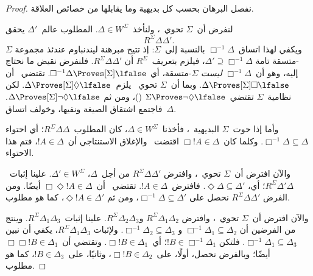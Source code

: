 \documentclass[../../../include/open-logic-section]{subfiles}
\begin{document}
\begin{proof}
  نفصل البرهان بحسب كل بديهية وما يقابلها من خصائص العلاقة.

  لنفرض أن~$\Sigma$ تحوي~، ولنأخذ~$\Delta \in W^\Sigma$.
  المطلوب عالم~$\Delta'$ يحقق
  \[
    R^\Sigma \Delta\Delta'.
  \]
  ويكفي لهذا اتساق~$\Box^{-1}\Delta$ بالنسبة إلى~$\Sigma$:
  إذ تتيح مبرهنة ليندنباوم عندئذ مجموعة $\Sigma$-متسقة تامة
  $\Delta' \supseteq \Box^{-1}\Delta$، فيلزم بتعريف~$R^\Sigma$
  أن
  $R^\Sigma \Delta\Delta'$.
  فلنفرض نقيض ما نحتاج إليه، وهو أن~$\Box^{-1}\Delta$
  \emph{ليست} $\Sigma$-متسقة، أي $\Box^{-1}\Delta \Proves[\Sigma] \lfalse$.
  تقتضي~ أن
  $\Delta \Proves[\Sigma] \Box\lfalse$.
  وبما أن~$\Sigma$ تحوي~ يلزم~$\Delta \Proves[\Sigma] \Diamond\lfalse$.
  لكن نظامية~$\Sigma$ تقتضي~$\Sigma \Proves \lnot\Diamond \lfalse$
  ()، ومن ثم
  $\Delta \Proves[\Sigma] \lnot\Diamond \lfalse$.
  فاجتمع اشتقاق الصيغة ونفيها، وخولف اتساق~$\Delta$.

  وأما إذا حوت~$\Sigma$ البديهية~، فأخذنا~$\Delta \in W^\Sigma$،
  كان المطلوب~$R^\Sigma \Delta\Delta$؛ أي احتواء
  $\Box^{-1}\Delta \subseteq \Delta$.
  وكلما كان~$\Box!A \in \Delta$ اقتضت~ والإغلاق الاستنتاجي
  أن~$!A \in \Delta$، فتم هذا الاحتواء.

  والآن افترض أن~$\Sigma$ تحوي~، وافترض
  $R^\Sigma \Delta\Delta'$ من أجل~$\Delta$، $\Delta' \in W^\Sigma$.
  علينا إثبات~$R^\Sigma \Delta'\Delta$؛ أي،
  $\Diamond\Delta \subseteq \Delta'$. فافترض~$!A \in \Delta$.
  تقتضي~ أن~$\Box\Diamond!A \in \Delta$ أيضًا. ومن الفرض
  $R^\Sigma \Delta\Delta'$ نحصل على
  $\Box^{-1}\Delta \subseteq \Delta'$، ومن ثم
  $\Diamond!A \in \Delta'$، كما هو مطلوب.

  والآن افترض أن~$\Sigma$ تحوي~، وافترض
  $R^\Sigma \Delta_1\Delta_2$ و$R^\Sigma \Delta_2\Delta_3$.
  علينا إثبات~$R^\Sigma \Delta_1\Delta_3$. وينتج من الفرضين
   أن
  $\Box^{-1}\Delta_1 \subseteq \Delta_2$ و
  $\Box^{-1}\Delta_2 \subseteq \Delta_3$. ولإثبات
  $R^\Sigma \Delta_1\Delta_3$، يكفي أن نبين
  $\Box^{-1}\Delta_1 \subseteq \Delta_3$. فلتكن
  $!B \in \Box^{-1}\Delta_1$؛ أي~$\Box!B \in \Delta_1$. وتقتضي
   أن~$\Box\Box!B \in \Delta_1$ أيضًا؛ وبالفرض نحصل، أولًا،
  على~$\Box!B \in \Delta_2$، وثانيًا، على~$!B \in \Delta_3$، كما هو
  مطلوب.


\end{proof}
\end{document}
